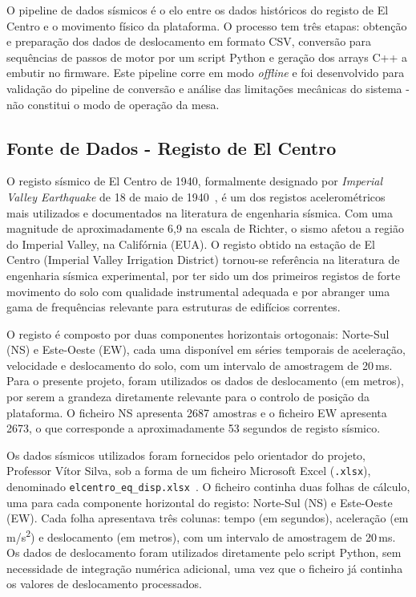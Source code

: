 O pipeline de dados sísmicos é o elo entre os dados históricos do registo de El Centro e o movimento físico da plataforma. O processo tem três etapas: obtenção e preparação dos dados de deslocamento em formato CSV, conversão para sequências de passos de motor por um script Python e geração dos arrays C++ a embutir no firmware. Este pipeline corre em modo \textit{offline} e foi desenvolvido para validação do pipeline de conversão e análise das limitações mecânicas do sistema - não constitui o modo de operação da mesa.


\subsection{Fonte de Dados - Registo de El Centro}
\label{subsec:fonte-dados}

O registo sísmico de El Centro de 1940, formalmente designado por \textit{Imperial Valley Earthquake} de 18 de maio de 1940~\cite{ElCentro1940}, é um dos registos acelerométricos mais utilizados e documentados na literatura de engenharia sísmica. Com uma magnitude de aproximadamente 6,9 na escala de Richter, o sismo afetou a região do Imperial Valley, na Califórnia (EUA). O registo obtido na estação de El Centro (Imperial Valley Irrigation District) tornou-se referência na literatura de engenharia sísmica experimental, por ter sido um dos primeiros registos de forte movimento do solo com qualidade instrumental adequada e por abranger uma gama de frequências relevante para estruturas de edifícios correntes.

O registo é composto por duas componentes horizontais ortogonais: Norte-Sul (NS) e Este-Oeste (EW), cada uma disponível em séries temporais de aceleração, velocidade e deslocamento do solo, com um intervalo de amostragem de 20\,ms. Para o presente projeto, foram utilizados os dados de deslocamento (em metros), por serem a grandeza diretamente relevante para o controlo de posição da plataforma. O ficheiro NS apresenta 2687 amostras e o ficheiro EW apresenta 2673, o que corresponde a aproximadamente 53 segundos de registo sísmico.

Os dados sísmicos utilizados foram fornecidos pelo orientador do projeto, Professor Vítor Silva, sob a forma de um ficheiro Microsoft Excel (\texttt{.xlsx}), denominado \texttt{elcentro\_eq\_disp.xlsx}~\cite{PEERDatabase}. O ficheiro continha duas folhas de cálculo, uma para cada componente horizontal do registo: Norte-Sul (NS) e Este-Oeste (EW). Cada folha apresentava três colunas: tempo (em segundos), aceleração (em m/s\textsuperscript{2}) e deslocamento (em metros), com um intervalo de amostragem de 20\,ms. Os dados de deslocamento foram utilizados diretamente pelo script Python, sem necessidade de integração numérica adicional, uma vez que o ficheiro já continha os valores de deslocamento processados.

